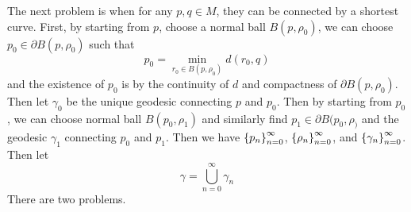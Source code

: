 The next problem is when for any $p,q \in M$, they can be connected by a shortest curve. First, by starting from $p$, choose a normal ball $B(p,\rho_0)$, we can choose $p_0 \in \partial B(p,\rho_0)$ such that
\begin{equation*}
	p_0 = \min_{r_0 \in B(p,\rho_0)}d(r_0,q)
\end{equation*}
and the existence of $p_0$ is by the continuity of $d$ and compactness of $\partial B(p,\rho_0)$. Then let $\gamma_0$ be the unique geodesic connecting $p$ and $p_0$. Then by starting from $p_0$, we can choose normal ball $B(p_0,\rho_1)$ and similarly find $p_1 \in \partial B(p_0,\rho_)$ and the geodesic $\gamma_1$ connecting $p_0$ and $p_1$. Then we have $\left\{p_n\right\}_{n=0}^\infty$, $\left\{\rho_n\right\}_{n=0}^\infty$, and $\left\{\gamma_n\right\}_{n=0}^\infty$. Then let 
\begin{equation*}
	\gamma = \bigcup_{n=0}^\infty \gamma_n
\end{equation*}
There are two problems.
